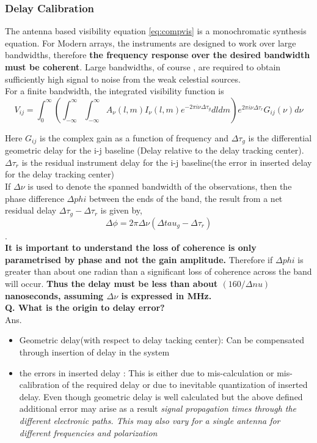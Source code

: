 \documentclass[10pt]{report}
\newcommand{\tbf}[1]{\textbf{#1}}
\newcommand{\tit}[1]{\textit{#1}}
\newcommand{\cc}[1]{\left({#1}\right)}
\begin{document}
\subsubsection{Delay Calibration}
The antenna based visibility equation \eqref{eq:compvis} is a monochromatic synthesis equation. For Modern arrays, the instruments are designed to work over large bandwidths, therefore \tbf{the frequency response over the desired bandwidth must be coherent}. Large bandwidths, of course , are required to obtain sufficiently high signal to noise from the weak celestial sources.\\
For a finite bandwidth, the integrated visibility function is 
\begin{equation}
V_{ij}=\int^\infty _{0}\cc{\int^\infty _{-\infty} \int^\infty _{-\infty}A_\nu(l,m)I_\nu(l,m)e^{-2\pi i \nu \Delta\tau_g}dl dm}e^{2\pi i \nu \Delta \tau_r}G_{ij}(\nu)d\nu
\end{equation}

Here $G_{ij}$ is the complex gain as a function of frequency and $\Delta \tau_g$ is the differential geometric delay for the i-j baseline (Delay relative to the delay tracking center). $\Delta \tau_r$ is the residual instrument delay for the i-j baseline(the error in inserted delay for the delay tracking center)\\

If $\Delta \nu$ is used to denote the spanned bandwidth of the observations, then the phase difference $\Delta phi$ between the ends of the band, the result from a net residual delay $\Delta \tau_g -\Delta \tau_r$ is given by,
\begin{equation}
\Delta \phi = 2 \pi \Delta \nu (\Delta tau_g -\Delta \tau_r)
\end{equation}.\\


\tbf{It is important to understand the loss of coherence is only parametrised by phase and not the gain amplitude. } Therefore if $\Delta phi$ is greater than about one radian than a significant loss of coherence across the band will occur. \tbf{Thus the delay must be less than about $(160/\Delta nu)$ nanoseconds, assuming $\Delta \nu$ is expressed in MHz.}\\

\tbf{Q. What is the origin to delay error?}\\

Ans. \begin{itemize}
\item Geometric delay(with respect to delay tacking center): Can be compensated through insertion of delay in the system 
\item the errors in inserted delay : This is either due to mis-calculation or mis-calibration of the required delay or due to inevitable quantization of inserted delay. Even though geometric delay is well calculated but the above defined additional error may arise as a result \tit{signal propagation times through the different electronic paths. This may also vary for a single antenna for different frequencies and polarization}
\end{itemize}
\end{document}
